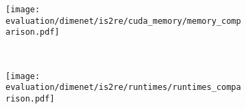 \begin{figure}[H]
    \vspace*{2em}

    \begin{subfigure}[t]{0.48\textwidth}
        \centering
        \texttt{[image: evaluation/dimenet/is2re/cuda\_memory/memory\_comparison.pdf]}
        \label{fig:dimenet-is2re-memory-results}
    \end{subfigure}%
    ~
    \begin{subfigure}[t]{0.48\textwidth}
        \centering
        \texttt{[image: evaluation/dimenet/is2re/runtimes/runtimes\_comparison.pdf]}
        \label{dimenet-is2re-runtimes-results}
    \end{subfigure}

    \vspace*{-1em}


\end{figure}

